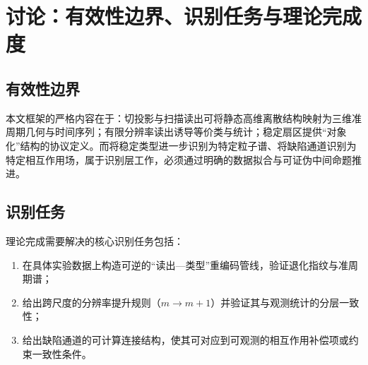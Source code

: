 \section{讨论：有效性边界、识别任务与理论完成度}

\subsection{有效性边界}

本文框架的严格内容在于：切投影与扫描读出可将静态高维离散结构映射为三维准周期几何与时间序列；有限分辨率读出诱导等价类与统计；稳定扇区提供“对象化”结构的协议定义。而将稳定类型进一步识别为特定粒子谱、将缺陷通道识别为特定相互作用场，属于识别层工作，必须通过明确的数据拟合与可证伪中间命题推进。

\subsection{识别任务}

理论完成需要解决的核心识别任务包括：
\begin{enumerate}
  \item 在具体实验数据上构造可逆的“读出—类型”重编码管线，验证退化指纹与准周期谱；
  \item 给出跨尺度的分辨率提升规则（$m\to m+1$）并验证其与观测统计的分层一致性；
  \item 给出缺陷通道的可计算连接结构，使其可对应到可观测的相互作用补偿项或约束一致性条件。
\end{enumerate}

